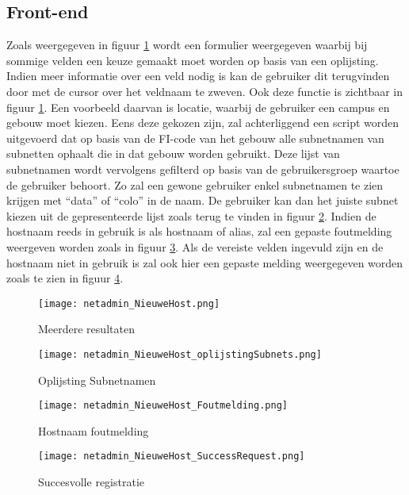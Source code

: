 \subsection{Front-end}
Zoals weergegeven in figuur \ref{fig:netadmin_NieuweHost} wordt een formulier weergegeven waarbij bij sommige velden een keuze gemaakt moet worden op basis van een oplijsting. Indien meer informatie over een veld nodig is kan de gebruiker dit terugvinden door met de cursor over het veldnaam te zweven. Ook deze functie is zichtbaar in figuur \ref{fig:netadmin_NieuweHost}.
Een voorbeeld daarvan is locatie, waarbij de gebruiker een campus en gebouw moet kiezen. Eens deze gekozen zijn, zal achterliggend een script worden uitgevoerd dat op basis van de FI-code van het gebouw alle subnetnamen van subnetten ophaalt die in dat gebouw worden gebruikt. Deze lijst van subnetnamen wordt vervolgens gefilterd op basis van de gebruikersgroep waartoe de gebruiker behoort. Zo zal een gewone gebruiker enkel subnetnamen te zien krijgen met “data” of “colo” in de naam. De gebruiker kan dan het juiste subnet kiezen uit de gepresenteerde lijst zoals terug te vinden in figuur \ref{fig:netadmin_NieuweHost_oplijstingSubnets}. Indien de hostnaam reeds in gebruik is als hostnaam of alias, zal een gepaste foutmelding weergeven worden zoals in figuur \ref{fig:netadmin_NieuweHost_Foutmelding}. Als de vereiste velden ingevuld zijn en de hostnaam niet in gebruik is zal ook hier een gepaste melding weergegeven worden zoals te zien in figuur \ref{fig:netadmin_NieuweHost_SuccessRequest}.
\begin{figure}[H]
    \texttt{[image: netadmin\_NieuweHost.png]}
    \caption{Meerdere resultaten}
    \label{fig:netadmin_NieuweHost}
\end{figure}
\begin{figure}[H]
    \texttt{[image: netadmin\_NieuweHost\_oplijstingSubnets.png]}
    \caption{Oplijsting Subnetnamen}
    \label{fig:netadmin_NieuweHost_oplijstingSubnets}
\end{figure}
\begin{figure}[H]
    \texttt{[image: netadmin\_NieuweHost\_Foutmelding.png]}
    \caption{Hostnaam foutmelding}
    \label{fig:netadmin_NieuweHost_Foutmelding}
\end{figure}
\begin{figure}[H]
    \texttt{[image: netadmin\_NieuweHost\_SuccessRequest.png]}
    \caption{Succesvolle registratie}
    \label{fig:netadmin_NieuweHost_SuccessRequest}
\end{figure}
